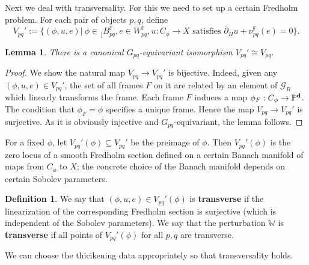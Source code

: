 \documentclass[reqno, 10pt]{amsart}
\numberwithin{equation}{section}
\numberwithin{equation}{section}
\renewcommand{\subset}{\subseteq}
\newtheorem{lemma}[thm]{Lemma}
\theoremstyle{definition}
\newtheorem{defn}[thm]{Definition}
\theoremstyle{remark}
\newcommand{\beqn}{\begin{equation*}}
\newcommand{\eeqn}{\end{equation*}}
\newcommand{\ov}{\overline}
\newcommand{\mb}{\mathbb}
\newcommand{\mc}{\mathcal}
\renewcommand{\outer}{{}_{\lfloor}}
\begin{document}
Next we deal with transversality. For this we need to set up a certain Fredholm problem. For each pair of objects $p, q$, define
\beqn
V_{pq}':= \Big\{ (\phi, u, e) |\ \phi \in \outer B^{\mb F}_{pq}, e \in W_{pq}^{\mb F}, u: C_\phi \to X \text{ satisfies }\ov\partial_H u + \nu_{pq}^{\mb F} (e) = 0 \Big\}.
\eeqn

\begin{lemma}
There is a canonical $G_{pq}$-equivariant isomorphism $V_{pq}' \cong V_{pq}$.
\end{lemma}

\begin{proof}
We show the natural map $V_{pq} \to V_{pq}'$ is bijective. Indeed, given any $(\phi, u, e) \in V_{pq}'$, the set of all frames $F$ on it are related by an element of ${\mc G}_R$ which linearly transforms the frame. Each frame $F$ induces a map $\phi_F: C_\phi \to \mb{P}^{\bf d}$. The condition that $\phi_F = \phi$ specifies a unique frame. Hence the map $V_{pq} \to V_{pq}'$ is surjective. As it is obviously injective and $G_{pq}$-equivariant, the lemma follows.
\end{proof}


For a fixed $\phi$, let $V_{pq}'(\phi) \subset V_{pq}'$ be the preimage of $\phi$. Then $V_{pq}'(\phi)$ is the zero locus of a smooth Fredholm section defined on a certain Banach manifold of maps from $C_\phi$ to $X$; the concrete choice of the Banach manifold depends on certain Sobolev parameters. 

\begin{defn}
We say that $(\phi, u, e) \in V_{pq}'(\phi)$ is {\bf transverse} if the linearization of the corresponding Fredholm section is surjective (which is independent of the Sobolev parameters). We say that the perturbation $\mb{W}$ is {\bf transverse} if all points of $V_{pq}'(\phi)$ for all $p,q$ are transverse. 
\end{defn}

We can choose the thicikening data appropriately so that transversality holds.
\end{document}
